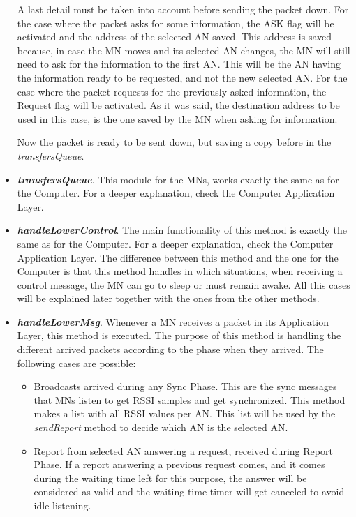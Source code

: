\begin{itemize}
A last detail must be taken into account before sending the packet down. For the case where the packet asks for some information, the ASK flag
will be activated and the address of the selected \ac{AN} saved. This address is saved because, in case the \ac{MN} moves and its selected \ac{AN}
changes, the \ac{MN} will still need to ask for the information to the first \ac{AN}. This will be the \ac{AN} having the information ready to be 
requested, and not the new selected \ac{AN}. For the case where the packet requests for the previously asked information, the Request flag will
be activated. As it was said, the destination address to be used in this case, is the one saved by the \ac{MN} when asking for information.

Now the packet is ready to be sent down, but saving a copy before in the \textit{transfersQueue}.


 \item \textbf{\textit{transfersQueue}}. This module for the \acp{MN}, works exactly the same as for the Computer. For a deeper explanation, check
the Computer Application Layer.

 \item \textbf{\textit{handleLowerControl}}. The main functionality of this method is exactly the same as for the Computer. For a deeper explanation, 
check the Computer Application Layer. The difference between this method and the one for the Computer is that this method handles in which situations,
when receiving a control message, the \ac{MN} can go to sleep or must remain awake. All this cases will be explained later together with the ones from
the other methods.

 \item \textbf{\textit{handleLowerMsg}}. Whenever a \ac{MN} receives a packet in its Application Layer, this method is executed. The purpose
of this method is handling the different arrived packets according to the phase when they arrived. The following cases are possible:
\begin{itemize}
  \item Broadcasts arrived during any Sync Phase. This are the sync messages that \acp{MN} listen to get \ac{RSSI} samples and get 
  synchronized. This method makes a list with all \ac{RSSI} values per \ac{AN}. This list will be used by the \textit{sendReport} method to 
  decide which \ac{AN} is the selected \ac{AN}.

  \item Report from selected \ac{AN} answering a request, received during Report Phase. If a report answering a previous request comes, and 
  it comes during the waiting time left for this purpose, the answer will be considered as valid and the waiting time timer will get canceled to 
  avoid idle listening.
\end{itemize}


\end{itemize}
